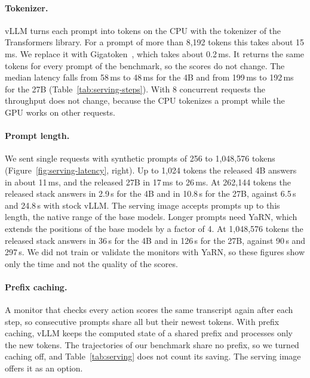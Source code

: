 \paragraph{Tokenizer.}
vLLM turns each prompt into tokens on the CPU with the tokenizer of the Transformers library.
For a prompt of more than 8,192 tokens this takes about 15\,ms.
We replace it with Gigatoken~\citep{roed2026gigatoken}, which takes about 0.2\,ms.
It returns the same tokens for every prompt of the benchmark, so the scores do not change.
The median latency falls from 58\,ms to 48\,ms for the 4B and from 199\,ms to 192\,ms for the 27B (Table~\ref{tab:serving-steps}).
With 8 concurrent requests the throughput does not change, because the CPU tokenizes a prompt while the GPU works on other requests.

\paragraph{Prompt length.}
We sent single requests with synthetic prompts of 256 to 1,048,576 tokens (Figure~\ref{fig:serving-latency}, right).
Up to 1,024 tokens the released 4B answers in about 11\,ms, and the released 27B in 17\,ms to 26\,ms.
At 262,144 tokens the released stack answers in 2.9\,s for the 4B and in 10.8\,s for the 27B, against 6.5\,s and 24.8\,s with stock vLLM.
The serving image accepts prompts up to this length, the native range of the base models.
Longer prompts need YaRN, which extends the positions of the base models by a factor of 4.
At 1,048,576 tokens the released stack answers in 36\,s for the 4B and in 126\,s for the 27B, against 90\,s and 297\,s.
We did not train or validate the monitors with YaRN, so these figures show only the time and not the quality of the scores.

\paragraph{Prefix caching.}
A monitor that checks every action scores the same transcript again after each step, so consecutive prompts share all but their newest tokens.
With prefix caching, vLLM keeps the computed state of a shared prefix and processes only the new tokens.
The trajectories of our benchmark share no prefix, so we turned caching off, and Table~\ref{tab:serving} does not count its saving.
The serving image offers it as an option.

